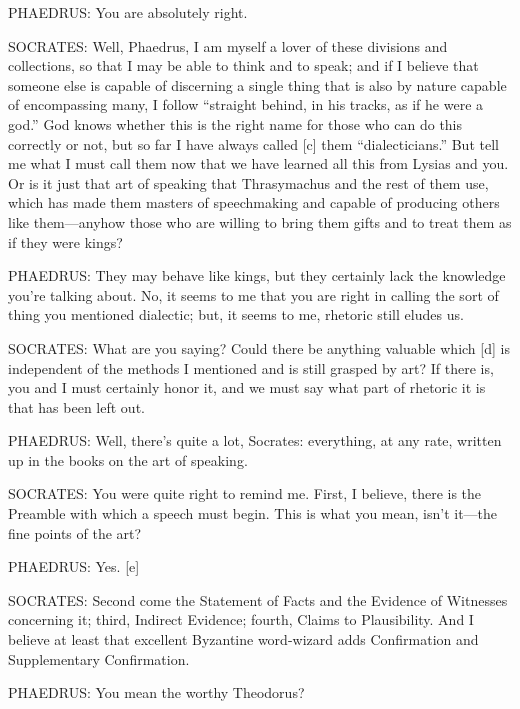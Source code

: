 PHAEDRUS: You are absolutely right.

SOCRATES: Well, Phaedrus, I am myself a lover of these divisions and
collections, so that I may be able to think and to speak; and if I
believe that someone else is capable of discerning a single thing that
is also by nature capable of encompassing
many, I follow
“straight behind, in his tracks, as if he were a
god.” God knows
whether this is the right name for those who can do this correctly or
not, but so far I have always called {[}c{]} them “dialecticians.” But
tell me what I must call them now that we have learned all this from
Lysias and you. Or is it just that art of speaking that Thrasymachus and
the rest of them use, which has made them masters of speechmaking and
capable of producing others like them---anyhow those who are willing to
bring them gifts and to treat them as if they were kings?

PHAEDRUS: They may behave like kings, but they certainly lack the
knowledge you're talking about. No, it seems to me that you are right in
calling the sort of thing you mentioned dialectic; but, it seems to me,
rhetoric still eludes us.

SOCRATES: What are you saying? Could there be anything valuable which
{[}d{]} is independent of the methods I mentioned and is still grasped
by art? If there is, you and I must certainly honor it, and we must say
what part of rhetoric it is that has been left out.

PHAEDRUS: Well, there's quite a lot, Socrates: everything, at any rate,
written up in the books on the art of speaking.

SOCRATES: You were quite right to remind me. First, I believe, there is
the Preamble with which a speech must begin. This is what you mean,
isn't it---the fine points of the art?

PHAEDRUS: Yes. {[}e{]}

SOCRATES: Second come the Statement of Facts and the Evidence of
Witnesses concerning it; third, Indirect Evidence; fourth, Claims to
Plausibility. And I believe at least that excellent Byzantine
word-wizard adds Confirmation and Supplementary Confirmation.

PHAEDRUS: You mean the worthy
Theodorus?


